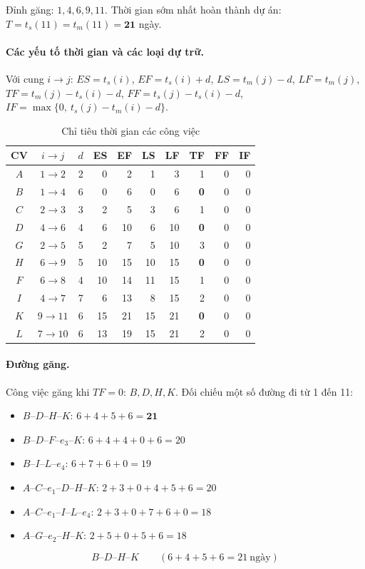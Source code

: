 \documentclass[12pt,a4paper]{article}
\begin{document}
Đỉnh găng: $1,4,6,9,11$.
Thời gian sớm nhất hoàn thành dự án: $T=t_s(11)=t_m(11)=\mathbf{21}$ ngày.

\paragraph{Các yếu tố thời gian và các loại dự trữ.}
Với cung $i\rightarrow j$:
$ES=t_s(i)$, $EF=t_s(i)+d$, $LS=t_m(j)-d$, $LF=t_m(j)$,
$TF=t_m(j)-t_s(i)-d$,
$FF=t_s(j)-t_s(i)-d$,
$IF=\max\{0,\ t_s(j)-t_m(i)-d\}$.

\begin{table}[H]\centering
\caption{Chỉ tiêu thời gian các công việc}
\small
\begin{tabular}{c|c|c|rr|rr|rrr}
\toprule
\textbf{CV} & $i\!\rightarrow\!j$ & $d$ & ES & EF & LS & LF & TF & FF & IF\\
\midrule
$A$ & $1\rightarrow 2$ & 2 & 0 & 2 & 1 & 3 & 1 & 0 & 0\\
$B$ & $1\rightarrow 4$ & 6 & 0 & 6 & 0 & 6 & \textbf{0} & 0 & 0\\
$C$ & $2\rightarrow 3$ & 3 & 2 & 5 & 3 & 6 & 1 & 0 & 0\\
$D$ & $4\rightarrow 6$ & 4 & 6 & 10 & 6 & 10 & \textbf{0} & 0 & 0\\
$G$ & $2\rightarrow 5$ & 5 & 2 & 7 & 5 & 10 & 3 & 0 & 0\\
$H$ & $6\rightarrow 9$ & 5 & 10 & 15 & 10 & 15 & \textbf{0} & 0 & 0\\
$F$ & $6\rightarrow 8$ & 4 & 10 & 14 & 11 & 15 & 1 & 0 & 0\\
$I$ & $4\rightarrow 7$ & 7 & 6 & 13 & 8 & 15 & 2 & 0 & 0\\
$K$ & $9\rightarrow 11$ & 6 & 15 & 21 & 15 & 21 & \textbf{0} & 0 & 0\\
$L$ & $7\rightarrow 10$ & 6 & 13 & 19 & 15 & 21 & 2 & 0 & 0\\
\bottomrule
\end{tabular}
\end{table}

\paragraph{Đường găng.}
Công việc găng khi $TF=0$: $B,D,H,K$.
Đối chiếu một số đường đi từ 1 đến 11:
\begin{itemize}[leftmargin=1.6em,itemsep=1pt]
  \item $B$--$D$--$H$--$K$: $6+4+5+6=\mathbf{21}$
  \item $B$--$D$--$F$--$e_3$--$K$: $6+4+4+0+6=20$
  \item $B$--$I$--$L$--$e_4$: $6+7+6+0=19$
  \item $A$--$C$--$e_1$--$D$--$H$--$K$: $2+3+0+4+5+6=20$
  \item $A$--$C$--$e_1$--$I$--$L$--$e_4$: $2+3+0+7+6+0=18$
  \item $A$--$G$--$e_2$--$H$--$K$: $2+5+0+5+6=18$
\end{itemize}
\[
  \boxed{B\text{--}D\text{--}H\text{--}K\qquad (6+4+5+6=21\ \text{ngày})}
\]
\end{document}
